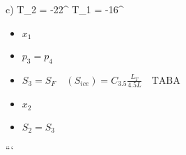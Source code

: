 c) \quad T_2 = -22^\circ {} \quad \quad T_1 = -16^\circ {}

\begin{itemize}
    \item $x_1$
    \item $p_3 = p_4$
    \item $S_3 = S_F \quad (S_{ice}) = C_{3.5} \frac{L_T}{4.5L} \quad \text{TABA}$
    \item $x_2$
    \item $S_2 = S_3$
\end{itemize}

```